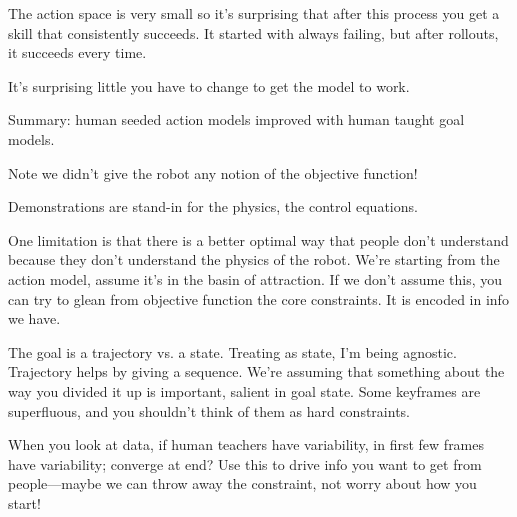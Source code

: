 The action space is very small so it's surprising that after this process you get a skill that consistently succeeds. It started with always failing, but after rollouts, it succeeds every time.

It's surprising little you have to change to get the model to work. 

Summary: human seeded action models improved with human taught goal models.

Note we didn't give the robot any notion of the objective function! %


Demonstrations are stand-in for the physics, the control equations.

One limitation is that there is a better optimal way that people don't understand because they don't understand the physics of the robot. We're starting from the action model, assume it's in the basin of attraction. If we don't assume this, you can try to glean from objective function the core constraints. It is encoded in info we have.

The goal is a trajectory vs. a state. Treating as state, I'm being agnostic. Trajectory helps by giving a sequence.
We're assuming that something about the way you divided it up is important, salient in goal state.
Some keyframes are superfluous, and you shouldn't think of them as hard constraints. 

When you look at data, if human teachers have variability, in first few frames have variability; converge at end? Use this to drive info you want to get from people---maybe we can throw away the constraint, not worry about how you start!
